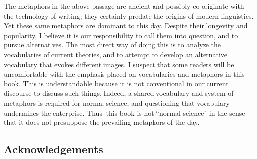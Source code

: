 The metaphors in the above passage are ancient and possibly co-originate with the technology of writing; they certainly predate the origins of modern linguistics. Yet these same metaphors are dominant to this day. Despite their longevity and popularity, I believe it is our responsibility to call them into question, and to pursue alternatives. The most direct way of doing this is to analyze the vocabularies of current theories, and to attempt to develop an alternative vocabulary that evokes different images. I suspect that some readers will be uncomfortable with the emphasis placed on vocabularies and metaphors in this book. This is understandable because it is not conventional in our current discourse to discuss such things. Indeed, a shared vocabulary and system of metaphors is required for normal science, and questioning that vocabulary undermines the enterprise. Thus, this book is not “normal science” in the sense that it does not presuppose the prevailing metaphors of the day.

\subsection{Acknowledgements}

